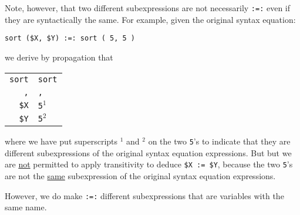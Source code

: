 \documentclass[12pt]{article}
\begin{document}
Note, however, that two different subexpressions
are not necessarily \verb|:=:| even if they are syntactically the same.
For example, given the original syntax equation:

\begin{center}
\verb/sort ($X, $Y) :=: sort ( 5, 5 )/
\end{center}

we derive by propagation that

\begin{center}
\begin{tabular}{r@{\tt ~:=:~}l}
\verb/sort/ & \verb/sort/ \\
\verb/,/ & \verb/,/ \\
\verb/$X/ & \verb/5/$^1$ \\
\verb/$Y/ & \verb/5/$^2$ \\
\end{tabular}
\end{center}

where we have put superscripts $^1$ and $^2$ on the two \verb|5|'s to
indicate that they are different subexpressions of the original
syntax equation expressions.  But
but we are \underline{not} permitted to apply transitivity
to deduce \verb|$X := $Y|,
because the two \verb|5|'s are not the \underline{same} subexpression of
the original syntax equation expressions.

However, we do make \verb|:=:| different subexpressions
that are variables with the same name.
\end{document}
